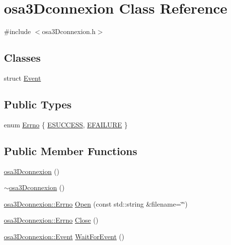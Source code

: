 \hypertarget{classosa3_dconnexion}{}\section{osa3\+Dconnexion Class Reference}
\label{classosa3_dconnexion}


{\ttfamily \#include $<$osa3\+Dconnexion.\+h$>$}

\subsection*{Classes}
\begin{DoxyCompactItemize}
\item 
struct \hyperlink{structosa3_dconnexion_1_1_event}{Event}
\end{DoxyCompactItemize}
\subsection*{Public Types}
\begin{DoxyCompactItemize}
\item 
enum \hyperlink{classosa3_dconnexion_aec0c86f7f6c58dc95c16c3ace14a495a}{Errno} \{ \hyperlink{classosa3_dconnexion_aec0c86f7f6c58dc95c16c3ace14a495aa4ea83bf03eb3b517bbb3d17bb20b57ce}{E\+S\+U\+C\+C\+E\+S\+S}, 
\hyperlink{classosa3_dconnexion_aec0c86f7f6c58dc95c16c3ace14a495aa0c4b4fba348d2bf3bf949906b0e3be11}{E\+F\+A\+I\+L\+U\+R\+E}
 \}
\end{DoxyCompactItemize}
\subsection*{Public Member Functions}
\begin{DoxyCompactItemize}
\item 
\hyperlink{classosa3_dconnexion_a763f8eb82c7475ad4c7411975ac9a149}{osa3\+Dconnexion} ()
\item 
\hyperlink{classosa3_dconnexion_a36c20a73e42c7c79520e410debaf62fa}{$\sim$osa3\+Dconnexion} ()
\item 
\hyperlink{classosa3_dconnexion_aec0c86f7f6c58dc95c16c3ace14a495a}{osa3\+Dconnexion\+::\+Errno} \hyperlink{classosa3_dconnexion_a6e0d61c02f263a9ccb94b2d0ced470fa}{Open} (const std\+::string \&filename=\char`\"{}\char`\"{})
\item 
\hyperlink{classosa3_dconnexion_aec0c86f7f6c58dc95c16c3ace14a495a}{osa3\+Dconnexion\+::\+Errno} \hyperlink{classosa3_dconnexion_acc2b3efc3a6b621a082e48ddbc84b14a}{Close} ()
\item 
\hyperlink{structosa3_dconnexion_1_1_event}{osa3\+Dconnexion\+::\+Event} \hyperlink{classosa3_dconnexion_ac9fcd8a404949f445ab4c41c965039f1}{Wait\+For\+Event} ()
\end{DoxyCompactItemize}


